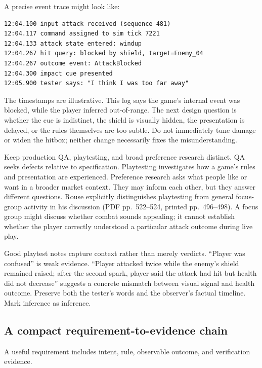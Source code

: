 A precise event trace might look like:

\begin{verbatim}
12:04.100 input attack received (sequence 481)
12:04.117 command assigned to sim tick 7221
12:04.133 attack state entered: windup
12:04.267 hit query: blocked by shield, target=Enemy_04
12:04.267 outcome event: AttackBlocked
12:04.300 impact cue presented
12:05.900 tester says: "I think I was too far away"
\end{verbatim}

The timestamps are illustrative. This log says the game's internal event was blocked, while the player inferred out-of-range. The next design question is whether the cue is indistinct, the shield is visually hidden, the presentation is delayed, or the rules themselves are too subtle. Do not immediately tune damage or widen the hitbox; neither change necessarily fixes the misunderstanding.

Keep production QA, playtesting, and broad preference research distinct. QA seeks defects relative to specification. Playtesting investigates how a game's rules and presentation are experienced. Preference research asks what people like or want in a broader market context. They may inform each other, but they answer different questions. Rouse explicitly distinguishes playtesting from general focus-group activity in his discussion (PDF pp.~522--524, printed pp.~496--498). A focus group might discuss whether combat sounds appealing; it cannot establish whether the player correctly understood a particular attack outcome during live play.

Good playtest notes capture context rather than merely verdicts. ``Player was confused'' is weak evidence. ``Player attacked twice while the enemy's shield remained raised; after the second spark, player said the attack had hit but health did not decrease'' suggests a concrete mismatch between visual signal and health outcome. Preserve both the tester's words and the observer's factual timeline. Mark inference as inference.

\subsection{A compact requirement-to-evidence chain}\label{06-engine-ii-ch041-a-compact-requirement-to-evidence-chain}

\hypertarget{06-engine-ii-ch041-a-compact-requirement-to-evidence-chain}{}

A useful requirement includes intent, rule, observable outcome, and verification evidence.

